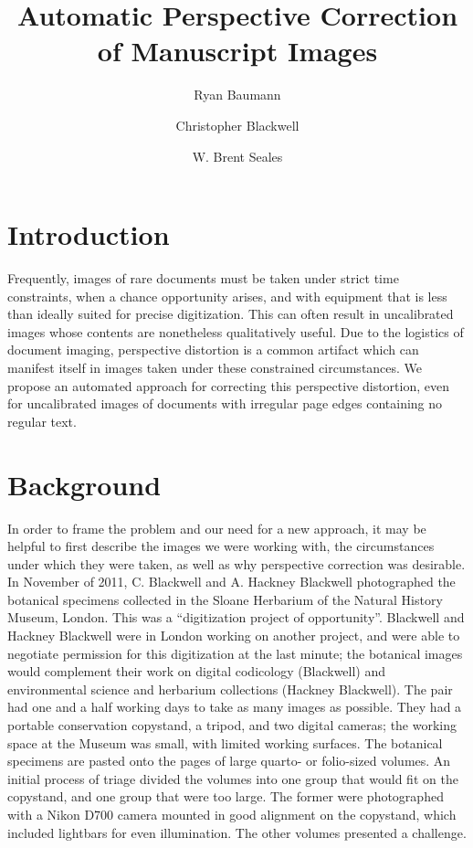 \documentclass[a4paper]{llncs}
\begin{document}
\mainmatter

\title{Automatic Perspective Correction of Manuscript Images}

\author{Ryan Baumann \and Christopher Blackwell \and W. Brent Seales}


\maketitle

\section{Introduction}

Frequently, images of rare documents must be taken under strict time constraints, 
when a chance opportunity arises, and with equipment that is less than ideally suited 
for precise digitization. This can often result in uncalibrated images
whose contents are nonetheless qualitatively useful. Due to the logistics of document
imaging, perspective distortion is a common artifact which can manifest itself in
images taken under these constrained circumstances. We propose an automated approach for
correcting this perspective distortion, even for uncalibrated images of documents
with irregular page edges containing no regular text.

\section{Background}

In order to frame the problem and our need for a new approach, it may be helpful to first describe the images
we were working with, the circumstances under which they were taken, as well as why perspective correction was desirable.
In November of 2011, C. Blackwell and A. Hackney Blackwell photographed the botanical specimens collected in the Sloane Herbarium of the Natural History Museum, London. This was a “digitization project of opportunity”. Blackwell and Hackney Blackwell were in London working on another project, and were able to negotiate permission for this digitization at the last minute; the botanical images would complement their work on digital codicology (Blackwell) and environmental science and herbarium collections (Hackney Blackwell). The pair had one and a half working days to take as many images as possible. They had a portable conservation copystand, a tripod, and two digital cameras; the working space at the Museum was small, with limited working surfaces. The botanical specimens are pasted onto the pages of large quarto- or folio-sized volumes. An initial process of triage divided the volumes into one group that would fit on the copystand, and one group that were too large. The former were photographed with a Nikon D700 camera mounted in good alignment on the copystand, which included lightbars for even illumination. The other volumes presented a challenge.
\end{document}
